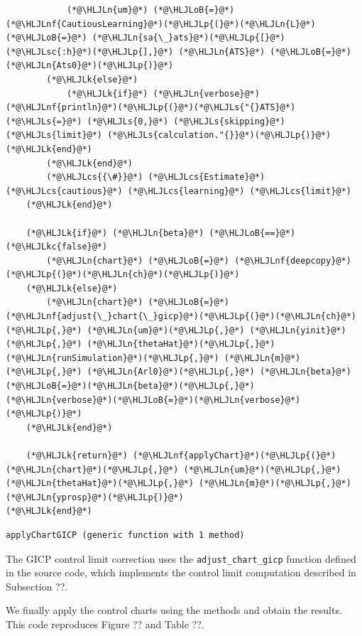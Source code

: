 \documentclass[12pt,a4paper]{article}
\newcommand{\HLJLk}[1]{\textcolor[RGB]{148,91,176}{\textbf{#1}}}
\newcommand{\HLJLkc}[1]{\textcolor[RGB]{59,151,46}{\textit{#1}}}
\newcommand{\HLJLn}[1]{#1}
\newcommand{\HLJLnf}[1]{\textcolor[RGB]{66,102,213}{#1}}
\newcommand{\HLJLs}[1]{\textcolor[RGB]{201,61,57}{#1}}
\newcommand{\HLJLsc}[1]{\textcolor[RGB]{201,61,57}{#1}}
\newcommand{\HLJLoB}[1]{\textcolor[RGB]{102,102,102}{\textbf{#1}}}
\newcommand{\HLJLp}[1]{#1}
\newcommand{\HLJLcs}[1]{\textcolor[RGB]{153,153,119}{\textit{#1}}}
\begin{document}
\begin{lstlisting}
            (*@\HLJLn{um}@*) (*@\HLJLoB{=}@*) (*@\HLJLnf{CautiousLearning}@*)(*@\HLJLp{(}@*)(*@\HLJLn{L}@*) (*@\HLJLoB{=}@*) (*@\HLJLn{sa{\_}ats}@*)(*@\HLJLp{[}@*)(*@\HLJLsc{:h}@*)(*@\HLJLp{],}@*) (*@\HLJLn{ATS}@*) (*@\HLJLoB{=}@*) (*@\HLJLn{Ats0}@*)(*@\HLJLp{)}@*)
        (*@\HLJLk{else}@*)
            (*@\HLJLk{if}@*) (*@\HLJLn{verbose}@*) (*@\HLJLnf{println}@*)(*@\HLJLp{(}@*)(*@\HLJLs{"{}ATS}@*) (*@\HLJLs{=}@*) (*@\HLJLs{0,}@*) (*@\HLJLs{skipping}@*) (*@\HLJLs{limit}@*) (*@\HLJLs{calculation."{}}@*)(*@\HLJLp{)}@*) (*@\HLJLk{end}@*)
        (*@\HLJLk{end}@*)
        (*@\HLJLcs{{\#}}@*) (*@\HLJLcs{Estimate}@*) (*@\HLJLcs{cautious}@*) (*@\HLJLcs{learning}@*) (*@\HLJLcs{limit}@*)
    (*@\HLJLk{end}@*)

    (*@\HLJLk{if}@*) (*@\HLJLn{beta}@*) (*@\HLJLoB{==}@*) (*@\HLJLkc{false}@*)
        (*@\HLJLn{chart}@*) (*@\HLJLoB{=}@*) (*@\HLJLnf{deepcopy}@*)(*@\HLJLp{(}@*)(*@\HLJLn{ch}@*)(*@\HLJLp{)}@*)
    (*@\HLJLk{else}@*)
        (*@\HLJLn{chart}@*) (*@\HLJLoB{=}@*) (*@\HLJLnf{adjust{\_}chart{\_}gicp}@*)(*@\HLJLp{(}@*)(*@\HLJLn{ch}@*)(*@\HLJLp{,}@*) (*@\HLJLn{um}@*)(*@\HLJLp{,}@*) (*@\HLJLn{yinit}@*)(*@\HLJLp{,}@*) (*@\HLJLn{thetaHat}@*)(*@\HLJLp{,}@*) (*@\HLJLn{runSimulation}@*)(*@\HLJLp{,}@*) (*@\HLJLn{m}@*)(*@\HLJLp{,}@*) (*@\HLJLn{Arl0}@*)(*@\HLJLp{,}@*) (*@\HLJLn{beta}@*)(*@\HLJLoB{=}@*)(*@\HLJLn{beta}@*)(*@\HLJLp{,}@*) (*@\HLJLn{verbose}@*)(*@\HLJLoB{=}@*)(*@\HLJLn{verbose}@*)(*@\HLJLp{)}@*)
    (*@\HLJLk{end}@*)

    (*@\HLJLk{return}@*) (*@\HLJLnf{applyChart}@*)(*@\HLJLp{(}@*)(*@\HLJLn{chart}@*)(*@\HLJLp{,}@*) (*@\HLJLn{um}@*)(*@\HLJLp{,}@*) (*@\HLJLn{thetaHat}@*)(*@\HLJLp{,}@*) (*@\HLJLn{m}@*)(*@\HLJLp{,}@*) (*@\HLJLn{yprosp}@*)(*@\HLJLp{)}@*)
(*@\HLJLk{end}@*)
\end{lstlisting}

\begin{lstlisting}
applyChartGICP (generic function with 1 method)
\end{lstlisting}


The GICP control limit correction uses the \texttt{adjust\_chart\_gicp} function defined in the source code, which implements the control limit computation described in Subsection ??.

We finally apply the control charts using the methods and obtain the results.  This code reproduces Figure ?? and Table ??.
\end{document}
